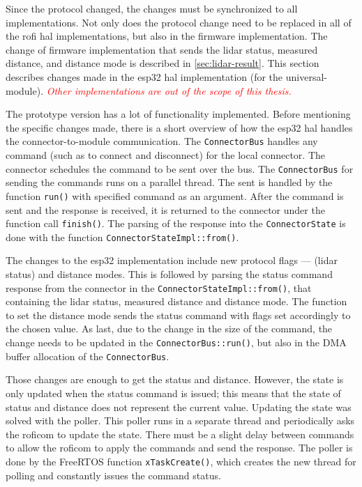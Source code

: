 \documentclass[
  digital,     %
  oneside,     %
  nosansbold,  %
  nocolorbold, %
  nolof,         %
  nolot,         %
]{fithesis4}
\newcommand{\TODO}[1]{\textcolor{red}{\textit{#1}}}
\begin{document}
{{{Since the protocol changed, the changes must be synchronized to all implementations. Not only does the protocol change need to be replaced in all of the \acrshort{rofi} \acrshort{hal} implementations, but also in the firmware implementation. The change of firmware implementation that sends the \acrshort{lidar} status, measured distance, and distance mode is described in \autoref{sec:lidar-result}. This section describes changes made in the esp32 \acrshort{hal} implementation (for the \gls{universal-module}). \TODO{Other implementations are out of the scope of this thesis.}

The prototype version has a lot of functionality implemented. Before mentioning the specific changes made, there is a short overview of how the esp32 \acrshort{hal} handles the connector-to-module communication. The \lstinline|ConnectorBus| handles any command (such as to connect and disconnect) for the local connector. The connector schedules the command to be sent over the bus. The \lstinline|ConnectorBus| for sending the commands runs on a parallel thread. The sent is handled by the function \lstinline|run()| with specified command as an argument. After the command is sent and the response is received, it is returned to the connector under the function call \lstinline|finish()|. The parsing of the response into the \lstinline|ConnectorState| is done with the function \lstinline|ConnectorStateImpl::from()|.

The changes to the esp32 implementation include new protocol flags --- (\acrshort{lidar} status) and distance modes. This is followed by parsing the status command response from the connector in the \lstinline|ConnectorStateImpl::from()|, that containing the \acrshort{lidar} status, measured distance and distance mode. The function to set the distance mode sends the status command with flags set accordingly to the chosen value. As last, due to the change in the size of the command, the change needs to be updated in the \lstinline|ConnectorBus::run()|, but also in the DMA buffer allocation of the \lstinline|ConnectorBus|.

Those changes are enough to get the status and distance. However, the state is only updated when the status command is issued; this means that the state of status and distance does not represent the current value. Updating the state was solved with the poller. This poller runs in a separate thread and periodically asks the \acrshort{roficom} to update the state. There must be a slight delay between commands to allow the \acrshort{roficom} to apply the commands and send the response. The poller is done by the FreeRTOS function \lstinline|xTaskCreate()|, which creates the new thread for polling and constantly issues the command status.

}}}
\end{document}
